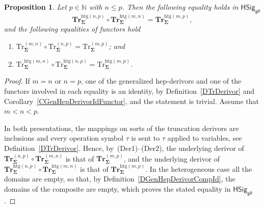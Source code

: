 \documentclass[a4paper, reqno]{amsbook}
\newcommand{\sig}[1]{\mathbf{#1}}             %
\newcommand{\gd}{\mathfrak{gd}}              %
\newcommand{\htg}{\mathrm{htg}}                %
\newcommand{\Tr}{\mathrm{Tr}}
\newcommand{\bTr}{\mathbf{Tr}}
\theoremstyle{plain}
\newtheorem{proposition}[theorem]{Proposition}
\theoremstyle{definition}
\begin{document}
\begin{proposition}\label{PTrComp}
Let $p\in\mathbb{N}$ with $n\leq p$.
Then the following equality holds in $\mathsf{HSig}_{\gd}$
$$
\bTr^{\htg(n,p)}_{\sig{\Sigma}}\circ\bTr^{\htg(m,n)}_{\sig{\Sigma}}=\bTr^{\htg(m,p)}_{\sig{\Sigma}},
$$
and the following equalities of functors hold
\begin{enumerate}
	\item
	$\Tr^{(m,n)}_{\sig{\Sigma}}\circ \Tr^{(n,p)}_{\sig{\Sigma}}=\Tr^{(m,p)}_{\sig{\Sigma}}$; and

	\item
	$\Tr^{\htg(m,n)}_{\sig{\Sigma}}\circ \Tr^{\htg(n,p)}_{\sig{\Sigma}}=\Tr^{\htg(m,p)}_{\sig{\Sigma}}$.
\end{enumerate}
\end{proposition}
\begin{proof}
If $m=n$ or $n=p$, one of the generalized hep-derivors and one of the functors involved in each equality is an identity, by Definition~\ref{DTrDerivor} and Corollary~\ref{CGenHepDerivorIdFunctor}, and the statement is trivial.
Assume that $m<n<p$.

In both presentations, the mappings on sorts of the truncation derivors are inclusions and every operation symbol $\tau$ is sent to $\tau$ applied to variables, see Definition~\ref{DTrDerivor}.
Hence, by~(Der1)--(Der2), the underlying derivor of $\bTr^{(n,p)}_{\sig{\Sigma}}\circ\bTr^{(m,n)}_{\sig{\Sigma}}$ is that of $\bTr^{(m,p)}_{\sig{\Sigma}}$, and the underlying derivor of $\bTr^{\htg(n,p)}_{\sig{\Sigma}}\circ\bTr^{\htg(m,n)}_{\sig{\Sigma}}$ is that of $\bTr^{\htg(m,p)}_{\sig{\Sigma}}$.
In the heterogeneous case all the domains are empty, so that, by Definition~\ref{DGenHepDerivorCompId}, the domains of the composite are empty, which proves the stated equality in $\mathsf{HSig}_{\gd}$.


\end{proof}
\end{document}
